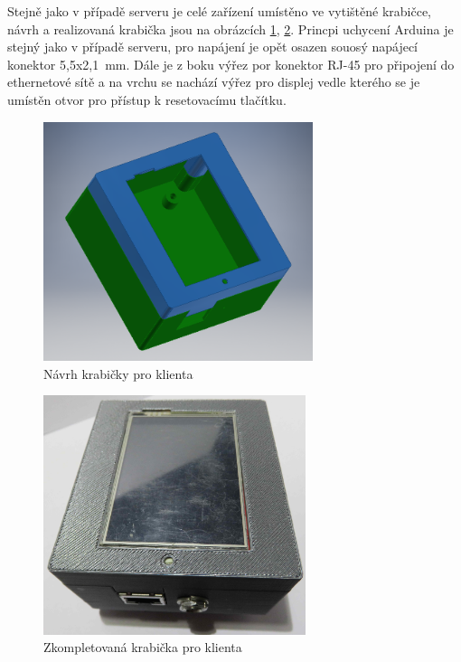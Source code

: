 Stejně jako v případě serveru je celé zařízení umístěno ve vytištěné krabičce, návrh a realizovaná krabička jsou na obrázcích \ref{fig:client_navrh}, \ref{fig:client_realizace}. Princpi uchycení Arduina je stejný jako v případě serveru, pro napájení je opět osazen souosý napájecí konektor 5,5x2,1~mm. Dále je z boku výřez por konektor RJ-45 pro připojení do ethernetové sítě a na vrchu se nachází výřez pro displej vedle kterého se je umístěn otvor pro přístup k resetovacímu tlačítku.


\begin{figure}[hbtp]
  \centering
  \includegraphics[height=7cm]{img/foto/client_navrh.png}
  \caption{\label{fig:client_navrh}Návrh krabičky pro klienta}
\end{figure}

\begin{figure}[hbtp]
  \centering
  \includegraphics[height=7cm]{img/foto/client_realizace.jpg}
  \caption{\label{fig:client_realizace}Zkompletovaná krabička pro klienta}
\end{figure}
